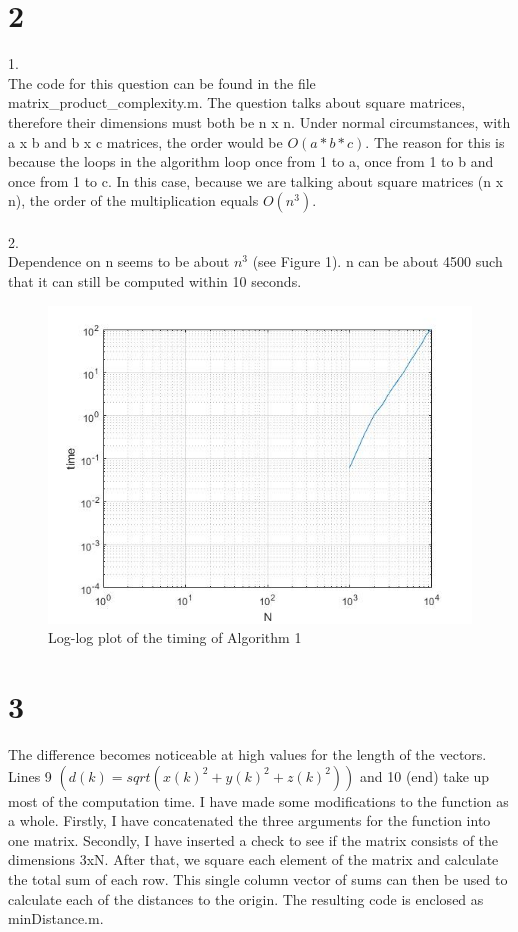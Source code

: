 \documentclass[a4paper, 12pt]{article}
\begin{document}
	\part*{2}
	1. \\
	The code for this question can be found in the file matrix\_product\_complexity.m.	
	The question talks about square matrices, therefore their dimensions must 
	both be n x n. Under normal circumstances, with a x b and b x c matrices, 
	the order would be $O(a*b*c)$. The reason for this is because the loops in the algorithm loop once from 1 to a, once from 1 to b and once from 1 to c. In this case, because we are talking about 
	square matrices (n x n), the order of the multiplication equals $O(n^3)$.\\\\
	2. \\
	Dependence on n seems to be about $n^3$ (see Figure 1). n can be about 4500 such 
	that it can still be computed within 10 seconds.\\
	\begin{figure}[!ht]
		\centering
		\includegraphics[width=\textwidth]{2}
		\caption{Log-log plot of the timing of Algorithm 1}
	\end{figure}	
	\newpage
	\part*{3}
	The difference becomes noticeable at high values for the length of the 
	vectors. Lines 9 $(d(k) = sqrt(x(k)^2 + y(k)^2 + z(k)^2))$ and 10 (end) take up most of the computation time.
	I have made some modifications to the function as a whole. Firstly, I have 
	concatenated the three arguments for the function into one matrix. 
	Secondly, I have inserted a check to see if the matrix consists of the 
	dimensions 3xN.
	After that, we square each element of the matrix and calculate the total 
	sum of each row. This single column vector of sums can then be used to 
	calculate each of the distances to the origin.
	The resulting code is enclosed as minDistance.m.
	\newpage
\end{document}
